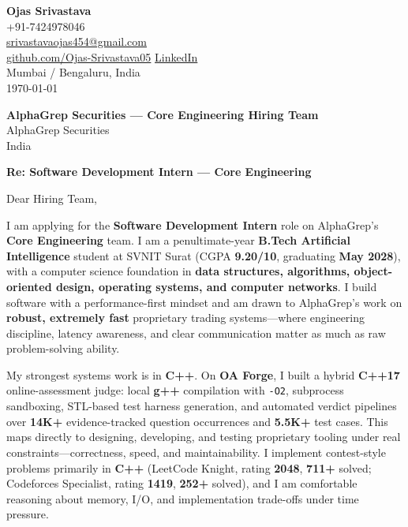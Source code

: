 \documentclass[a4paper,11pt]{article}
\begin{document}
\begin{flushright}
\textbf{Ojas Srivastava} \\
+91-7424978046 \\
\href{mailto:srivastavaojas454@gmail.com}{srivastavaojas454@gmail.com} \\
\href{https://github.com/Ojas-Srivastava05}{github.com/Ojas-Srivastava05} \textbar{}
\href{https://linkedin.com/in/ojas-srivastava05}{LinkedIn} \\
Mumbai / Bengaluru, India \\
\today
\end{flushright}

\vspace{4mm}
\textbf{AlphaGrep Securities --- Core Engineering Hiring Team} \\
AlphaGrep Securities \\
India

\vspace{2mm}
\textbf{Re: Software Development Intern --- Core Engineering}

Dear Hiring Team,

I am applying for the \textbf{Software Development Intern} role on AlphaGrep's \textbf{Core Engineering} team. I am a penultimate-year \textbf{B.Tech Artificial Intelligence} student at SVNIT Surat (CGPA \textbf{9.20/10}, graduating \textbf{May 2028}), with a computer science foundation in \textbf{data structures, algorithms, object-oriented design, operating systems, and computer networks}. I build software with a performance-first mindset and am drawn to AlphaGrep's work on \textbf{robust, extremely fast} proprietary trading systems---where engineering discipline, latency awareness, and clear communication matter as much as raw problem-solving ability.

My strongest systems work is in \textbf{C++}. On \textbf{OA Forge}, I built a hybrid \textbf{C++17} online-assessment judge: local \textbf{g++} compilation with \texttt{-O2}, subprocess sandboxing, STL-based test harness generation, and automated verdict pipelines over \textbf{14K+} evidence-tracked question occurrences and \textbf{5.5K+} test cases. This maps directly to designing, developing, and testing proprietary tooling under real constraints---correctness, speed, and maintainability. I implement contest-style problems primarily in \textbf{C++} (LeetCode Knight, rating \textbf{2048}, \textbf{711+} solved; Codeforces Specialist, rating \textbf{1419}, \textbf{252+} solved), and I am comfortable reasoning about memory, I/O, and implementation trade-offs under time pressure.
\end{document}
